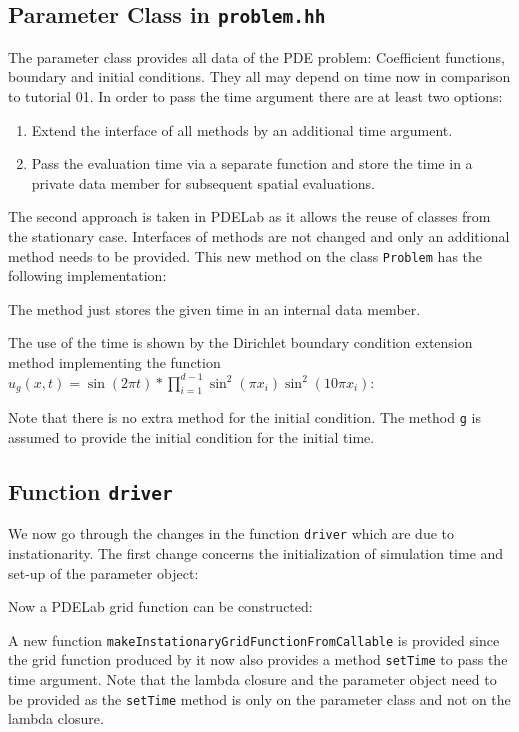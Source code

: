 \documentclass[a4paper,12pt]{article}
\begin{document}
\subsection{Parameter Class in \lstinline{problem.hh}}

The parameter class provides all data of the PDE problem: Coefficient functions,
boundary and initial conditions. They all may depend on time now in comparison to tutorial 01.
In order to pass the time argument there are at least two options:
\begin{enumerate}[1)]
\item Extend the interface of all methods by an additional time
argument.
\item Pass the evaluation time via a separate function and store the
time in a private data member for subsequent spatial evaluations.
\end{enumerate}
The second approach is taken in PDELab as it allows the reuse
of classes from the stationary case. Interfaces of methods are not changed
and only an additional method needs to be provided.
This new method on the class \lstinline{Problem} has the following implementation:

The method just stores the given time in
an internal data member.

The use of the time is shown by the Dirichlet boundary condition
extension method implementing the function
$u_g(x,t) = \sin(2\pi t)*\prod_{i=1}^{d-1} \sin^2(\pi x_i)\sin^2(10\pi x_i)$:

Note that there is no extra method for the initial condition.
The method \lstinline{g} is assumed to provide the initial condition
for the initial time.

\subsection{Function \lstinline{driver}}

We now go through the changes in the function \lstinline{driver} which
are due to instationarity. The first change concerns
the initialization of simulation time and set-up of the parameter object:


Now a PDELab grid function can be constructed:

A new function \lstinline{makeInstationaryGridFunctionFromCallable}
is provided since the grid function produced by it now also
provides a method \lstinline{setTime} to pass the time argument.
Note that the lambda closure and the parameter object need to be
provided as the \lstinline{setTime} method is only on the parameter class
and not on the lambda closure.
\end{document}
